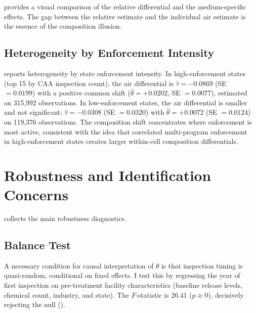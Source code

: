 \documentclass[12pt]{article}
\begin{document}
 provides a visual comparison of the relative differential and the medium-specific effects. The gap between the relative estimate and the individual air estimate is the essence of the composition illusion.

\subsection{Heterogeneity by Enforcement Intensity}



 reports heterogeneity by state enforcement intensity. In high-enforcement states (top 15 by CAA inspection count), the air differential is $\hat{\tau} = -0.0869$ (SE $= 0.0199$) with a positive common shift ($\hat{\theta} = +0.0202$, SE $= 0.0077$), estimated on 315,992 observations. In low-enforcement states, the air differential is smaller and not significant: $\hat{\tau} = -0.0308$ (SE $= 0.0320$) with $\hat{\theta} = +0.0072$ (SE $= 0.0124$) on 119,376 observations. The composition shift concentrates where enforcement is most active, consistent with the idea that correlated multi-program enforcement in high-enforcement states creates larger within-cell composition differentials.


\section{Robustness and Identification Concerns}
\label{sec:robustness}



 collects the main robustness diagnostics.

\subsection{Balance Test}

A necessary condition for causal interpretation of $\theta$ is that inspection timing is quasi-random, conditional on fixed effects. I test this by regressing the year of first inspection on pre-treatment facility characteristics (baseline release levels, chemical count, industry, and state). The $F$-statistic is 26.41 ($p \approx 0$), decisively rejecting the null ().
\end{document}
